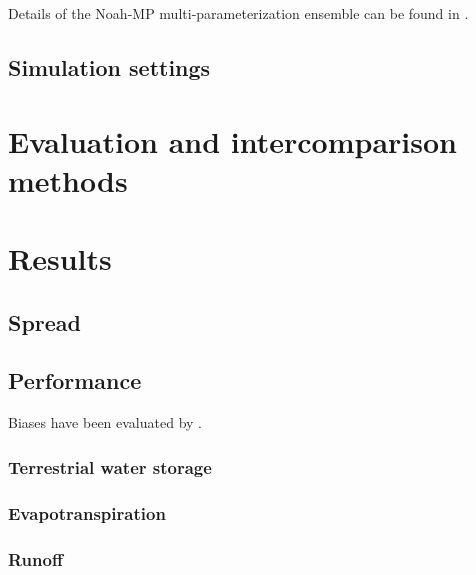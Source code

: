 \documentclass[essd]{copernicus}
\begin{document}
Details of the Noah-MP multi-parameterization ensemble can be found in
\citet{zheng2019WRR, zheng2020JAMES, fei2021WRR}.


\subsection{Simulation settings} \label{sec:data:simulation}


\section{Evaluation and intercomparison methods} \label{sec:evaluation}


\section{Results} \label{sec:result}

\subsection{Spread}

\subsection{Performance}
Biases have been evaluated by \citet{zheng2020JAMES}.

\subsubsection{Terrestrial water storage}

\citep{landerer2012WRR}


\subsubsection{Evapotranspiration}

\subsubsection{Runoff}


 \label{sec:availability}
\end{document}
